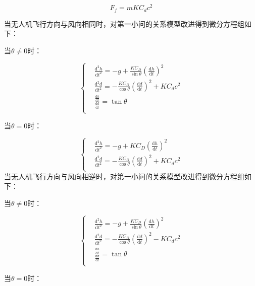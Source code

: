 \documentclass[normalsize]{ctexart}
\begin{document}
\begin{equation}
	F_f=mKC_dc^2 
\end{equation}
\par 当无人机飞行方向与风向相同时，对第一小问的关系模型改进得到微分方程组如下：
\begin{center}
	当$\theta\neq0$时：
\end{center}
\begin{equation}
	\begin{cases}
		& \frac{\mathrm{d}^2h}{\mathrm{d}t^2}=-g+\frac{KC_D}{\sin\theta}(\frac{\mathrm{d}h}{\mathrm{d}t})^2\\
		& \frac{\mathrm{d}^2d}{\mathrm{d}t^2}=-\frac{KC_D}{\cos\theta}(\frac{\mathrm{d}d}{\mathrm{d}t})^2+KC_dc^2\\
		& \frac{\frac{\mathrm{d}h}{\mathrm{d}t}}{\frac{\mathrm{d}d}{\mathrm{d}t}}=\tan\theta\\
	\end{cases}
\end{equation}
\begin{center}
	当$\theta=0$时：
\end{center}
\begin{equation}
	\begin{cases}
		& \frac{\mathrm{d}^2h}{\mathrm{d}t^2}=-g+KC_D(\frac{\mathrm{d}h}{\mathrm{d}t})^2\\
		& \frac{\mathrm{d}^2d}{\mathrm{d}t^2}=-\frac{KC_D}{\cos\theta}(\frac{\mathrm{d}d}{\mathrm{d}t})^2+KC_dc^2\\
	\end{cases}
\end{equation}
当无人机飞行方向与风向相逆时，对第一小问的关系模型改进得到微分方程组如下：
\begin{center}
	当$\theta\neq0$时：
\end{center}
\begin{equation}
	\begin{cases}
		& \frac{\mathrm{d}^2h}{\mathrm{d}t^2}=-g+\frac{KC_D}{\sin\theta}(\frac{\mathrm{d}h}{\mathrm{d}t})^2\\
		& \frac{\mathrm{d}^2d}{\mathrm{d}t^2}=-\frac{KC_D}{\cos\theta}(\frac{\mathrm{d}d}{\mathrm{d}t})^2-{KC_d}c^2\\
		& \frac{\frac{\mathrm{d}h}{\mathrm{d}t}}{\frac{\mathrm{d}d}{\mathrm{d}t}}=\tan\theta\\
	\end{cases}
\end{equation}
\begin{center}
	当$\theta=0$时：
\end{center}
\end{document}

